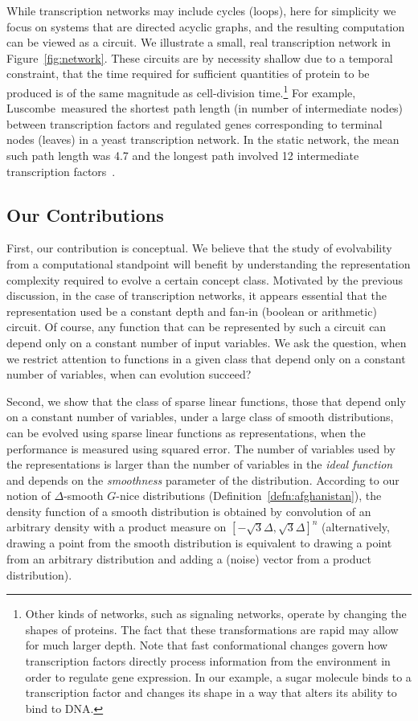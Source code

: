 While transcription networks may include cycles (loops), here for simplicity we
focus on systems that are directed acyclic graphs, and the resulting computation
can be viewed as a circuit. We illustrate a small, real transcription network in
Figure~\ref{fig:network}. These circuits are by necessity shallow due to
a temporal constraint, that the time required for sufficient quantities of
protein to be produced is of the same magnitude as cell-division
time.\footnote{Other kinds of networks, such as signaling networks, operate by
changing the shapes of proteins. The fact that these transformations are rapid
may allow for much larger depth. Note that fast conformational changes govern
how transcription factors directly process information from the environment in
order to regulate gene expression.  In our example, a sugar molecule binds to a
transcription factor and changes its shape in a way that alters its ability to
bind to DNA.} For example, Luscombe~\etal measured the shortest path length (in
number of intermediate nodes) between transcription factors and regulated genes
corresponding to terminal nodes (leaves) in a yeast transcription network. In
the static network, the mean such path length was 4.7 and the longest path
involved 12 intermediate transcription factors~\cite{Luscombe:2004}.

\subsection{Our Contributions}

First, our contribution is conceptual. We believe that the study of evolvability
from a computational standpoint will benefit by understanding the representation
complexity required to evolve a certain concept class. Motivated by the previous
discussion, in the case of transcription networks, it appears essential that the
representation used be a constant depth and fan-in (boolean or arithmetic)
circuit. Of course, any function that can be represented by such a circuit can
depend only on a constant number of input variables. We ask the
question, when we restrict attention to functions in a given class that depend
only on a constant number of variables, when can evolution succeed?

Second, we show that the class of sparse linear functions, those that depend
only on a constant number of variables, under a large class of smooth
distributions, can be evolved using sparse linear functions as representations,
when the performance is measured using squared error. The number of variables
used by the representations is larger than the number of variables in the
\emph{ideal function} and depends on the \emph{smoothness} parameter of the
distribution. According to our notion of $\Delta$-smooth $G$-nice distributions
(Definition~\ref{defn:afghanistan}), the density function of a smooth distribution
is obtained by convolution of an arbitrary density with a product measure on
$[-\sqrt{3}\Delta, \sqrt{3}\Delta]^n$ (alternatively, drawing a point from the
smooth distribution is equivalent to drawing a point from an arbitrary
distribution and adding a (noise) vector from a product distribution). 

